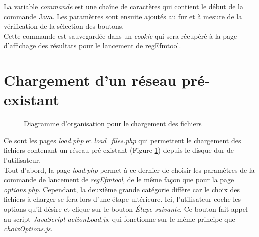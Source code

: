 La variable \textit{commande} est une chaîne de caractères qui contient le début de la commande Java. Les paramètres sont ensuite ajoutés au fur et à mesure de la vérification de la sélection des boutons. \\

Cette commande est sauvegardée dans un \textit{cookie} qui sera récupéré à la page d'affichage des résultats pour le lancement de regEfmtool. 

\section{Chargement d'un réseau pré-existant}

\begin{figure}[!ht]
	\begin{center}
		\caption{Diagramme d'organisation pour le chargement des fichiers}
  		\label{DiagLoad}
  	\end{center}	
\end{figure}

Ce sont les pages \emph{load.php} et \emph{load\_files.php} qui permettent le chargement des fichiers contenant un réseau pré-existant (Figure \ref{DiagLoad}) depuis le disque dur de l'utilisateur.\\

Tout d'abord, la page \emph{load.php} permet à ce dernier de choisir les paramètres de la commande de lancement de \textit{regEfmtool}, de le même façon que pour la page \emph{options.php}. Cependant, la deuxième grande catégorie diffère car le choix des fichiers à charger se fera lors d'une étape ultérieure. Ici, l'utilisateur coche les options qu'il désire et clique sur le bouton \textit{Étape suivante}. Ce bouton fait appel au script \emph{JavaScript} \emph{actionLoad.js}, qui fonctionne sur le même principe que \emph{choixOptions.js}. \\

